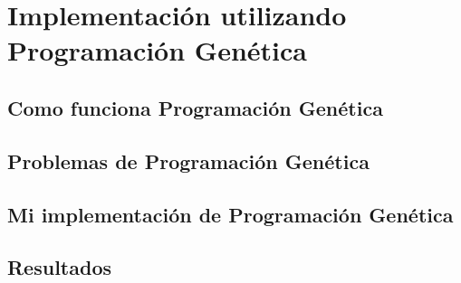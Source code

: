 \section{Implementación utilizando Programación Genética}

\subsection{Como funciona Programación Genética}

\subsection{Problemas de Programación Genética}

\subsection{Mi implementación de Programación Genética}

\subsection{Resultados}

